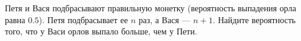 \documentclass{article}
\begin{document}
Петя и Вася подбрасывают правильную монетку (вероятность выпадения орла равна $0.5$). Петя подбрасывает ее $n$ раз, а Вася --- $n+1$. 
Найдите вероятность того, что у Васи орлов выпало больше, чем у Пети.
\end{document}
